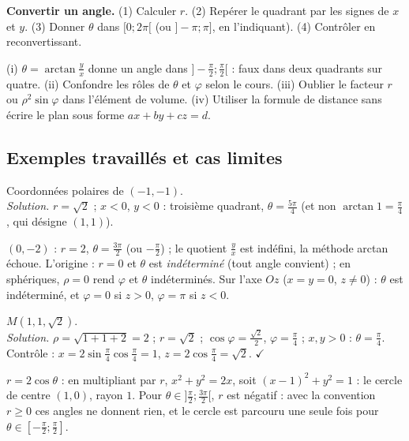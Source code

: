 \begin{methode}
\textbf{Convertir un angle.} (1) Calculer $r$. (2) Repérer le quadrant par les signes de $x$ et $y$. (3) Donner $\theta$ dans $[0;2\pi[$ (ou $]-\pi;\pi]$, en l'indiquant). (4) Contrôler en reconvertissant.
\end{methode}
\begin{piege}
(i) $\theta=\arctan\frac yx$ donne un angle dans $]-\frac\pi2;\frac\pi2[$ : faux dans deux quadrants sur quatre. (ii) Confondre les rôles de $\theta$ et $\varphi$ selon le cours. (iii) Oublier le facteur $r$ ou $\rho^2\sin\varphi$ dans l'élément de volume. (iv) Utiliser la formule de distance sans écrire le plan sous forme $ax+by+cz=d$.
\end{piege}

\subsection{Exemples travaillés et cas limites}
\begin{exemple}[quadrant]
Coordonnées polaires de $(-1,-1)$.\\
\emph{Solution.} $r=\sqrt2$ ; $x<0$, $y<0$ : troisième quadrant, $\theta=\frac{5\pi}4$ (et non $\arctan1=\frac\pi4$, qui désigne $(1,1)$).
\end{exemple}
\begin{cas}
$(0,-2)$ : $r=2$, $\theta=\frac{3\pi}2$ (ou $-\frac\pi2$) ; le quotient $\frac yx$ est indéfini, la méthode \og arctan \fg{} échoue. L'origine : $r=0$ et $\theta$ est \emph{indéterminé} (tout angle convient) ; en sphériques, $\rho=0$ rend $\varphi$ et $\theta$ indéterminés. Sur l'axe $Oz$ ($x=y=0$, $z\ne0$) : $\theta$ est indéterminé, et $\varphi=0$ si $z>0$, $\varphi=\pi$ si $z<0$.
\end{cas}
\begin{exemple}
$M(1,1,\sqrt2)$.\\
\emph{Solution.} $\rho=\sqrt{1+1+2}=2$ ; $r=\sqrt2$ ; $\cos\varphi=\frac{\sqrt2}2$, $\varphi=\frac\pi4$ ; $x,y>0$ : $\theta=\frac\pi4$. Contrôle : $x=2\sin\frac\pi4\cos\frac\pi4=1$, $z=2\cos\frac\pi4=\sqrt2$. $\checkmark$
\end{exemple}
\begin{cas}
$r=2\cos\theta$ : en multipliant par $r$, $x^2+y^2=2x$, soit $(x-1)^2+y^2=1$ : le cercle de centre $(1,0)$, rayon $1$. Pour $\theta\in]\frac\pi2;\frac{3\pi}2[$, $r$ est négatif : avec la convention $r\ge0$ ces angles ne donnent rien, et le cercle est parcouru une seule fois pour $\theta\in[-\frac\pi2;\frac\pi2]$.
\end{cas}

